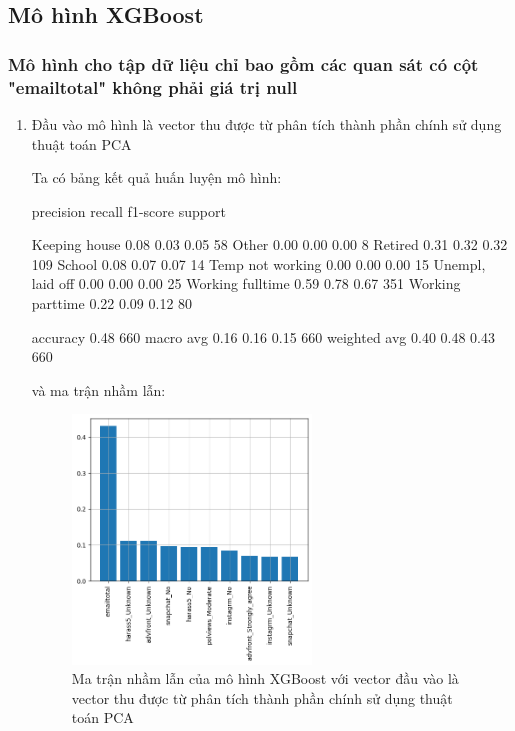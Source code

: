 \subsection{Mô hình XGBoost}

\subsubsection{Mô hình cho tập dữ liệu chỉ bao gồm các quan sát có cột "emailtotal" không phải giá trị null}

\begin{enumerate}[label=(\alph*)]
    \item Đầu vào mô hình là vector thu được từ phân tích thành phần chính sử dụng thuật toán PCA
    
    Ta có bảng kết quả huấn luyện mô hình:

    \begin{python}
                    precision    recall  f1-score   support

   Keeping house       0.08      0.03      0.05        58
           Other       0.00      0.00      0.00         8
         Retired       0.31      0.32      0.32       109
          School       0.08      0.07      0.07        14
Temp not working       0.00      0.00      0.00        15
Unempl, laid off       0.00      0.00      0.00        25
Working fulltime       0.59      0.78      0.67       351
Working parttime       0.22      0.09      0.12        80

        accuracy                           0.48       660
       macro avg       0.16      0.16      0.15       660
    weighted avg       0.40      0.48      0.43       660

    \end{python}

    và ma trận nhầm lẫn:

    \begin{figure}[H]
        \centering
        \includegraphics[width=0.6\textwidth]{figures/Thanh/Models/XGBoost/Non_null_models_Feature_Importance_XGBoost_PCA_features.png}
        \caption{Ma trận nhầm lẫn của mô hình XGBoost với vector đầu vào là vector thu được từ phân tích thành phần chính sử dụng thuật toán PCA}
        \label{fig:Non_null_models_Feature_Importance_XGBoost_PCA_features}
    \end{figure}


\end{enumerate}

